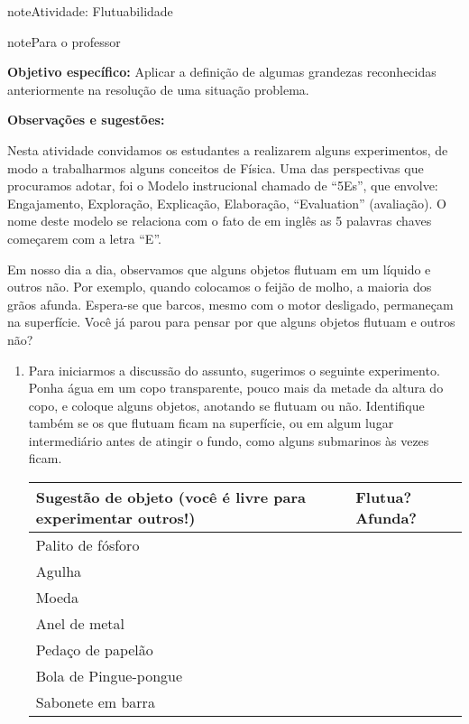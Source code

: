 \begin{sphinxadmonition}{note}{Atividade: Flutuabilidade}

\begin{sphinxadmonition}{note}{Para o professor}

\textbf{Objetivo específico:} Aplicar a definição de algumas grandezas reconhecidas anteriormente na resolução de uma situação problema.

\textbf{Observações e sugestões:}

Nesta atividade convidamos os estudantes a realizarem alguns experimentos, de modo a trabalharmos alguns conceitos de Física.  Uma das perspectivas que procuramos adotar, foi o Modelo instrucional chamado de “5Es”, que envolve: Engajamento, Exploração, Explicação, Elaboração, “Evaluation” (avaliação). O nome deste modelo se relaciona com o fato de em inglês as 5 palavras chaves começarem com a letra “E”.
\end{sphinxadmonition}

Em nosso dia a dia, observamos que alguns objetos flutuam em um líquido e outros não. Por exemplo, quando colocamos o feijão de molho, a maioria dos grãos afunda. Espera-se que barcos, mesmo com o motor desligado,  permaneçam na superfície. Você já parou para pensar por que alguns objetos flutuam e outros não?
\begin{enumerate}
\item {} 
Para iniciarmos a discussão do assunto, sugerimos o seguinte experimento. Ponha água em um copo transparente, pouco mais da metade da altura do copo, e coloque  alguns objetos, anotando se flutuam ou não. Identifique também se os que flutuam ficam na superfície, ou em algum lugar intermediário antes de atingir o fundo, como alguns submarinos às vezes ficam.


\begin{savenotes}\sphinxattablestart
\centering
\begin{tabulary}{\linewidth}[t]{|T|T|}
\hline

Sugestão de objeto (você é
livre para experimentar outros!)
&
Flutua? Afunda?
\\
\hline
Palito de fósforo
&\\
\hline
Agulha
&\\
\hline
Moeda
&\\
\hline
Anel de metal
&\\
\hline
Pedaço de papelão
&\\
\hline
Bola
de Pingue-pongue
&\\
\hline
Sabonete
em barra
&\\
\hline
\end{tabulary}
\par
\sphinxattableend\end{savenotes}


\end{enumerate}
\end{sphinxadmonition}
